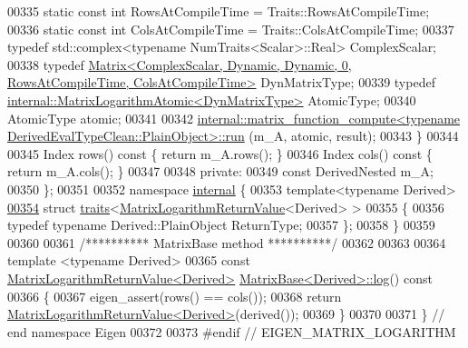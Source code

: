 \begin{DoxyCode}
00335     \textcolor{keyword}{static} \textcolor{keyword}{const} \textcolor{keywordtype}{int} RowsAtCompileTime = Traits::RowsAtCompileTime;
00336     \textcolor{keyword}{static} \textcolor{keyword}{const} \textcolor{keywordtype}{int} ColsAtCompileTime = Traits::ColsAtCompileTime;
00337     \textcolor{keyword}{typedef} std::complex<typename NumTraits<Scalar>::Real> ComplexScalar;
00338     \textcolor{keyword}{typedef} 
      \hyperlink{group___core___module_class_eigen_1_1_matrix}{Matrix<ComplexScalar, Dynamic, Dynamic, 0, RowsAtCompileTime, ColsAtCompileTime>}
       DynMatrixType;
00339     \textcolor{keyword}{typedef} \hyperlink{class_eigen_1_1internal_1_1_matrix_logarithm_atomic}{internal::MatrixLogarithmAtomic<DynMatrixType>} 
      AtomicType;
00340     AtomicType atomic;
00341     
00342     
      \hyperlink{struct_eigen_1_1internal_1_1matrix__function__compute_a55a328773f5254d0cd29ac699bc2634f}{internal::matrix\_function\_compute<typename DerivedEvalTypeClean::PlainObject>::run}
      (m\_A, atomic, result);
00343   \}
00344 
00345   Index rows()\textcolor{keyword}{ const }\{ \textcolor{keywordflow}{return} m\_A.rows(); \}
00346   Index cols()\textcolor{keyword}{ const }\{ \textcolor{keywordflow}{return} m\_A.cols(); \}
00347   
00348 \textcolor{keyword}{private}:
00349   \textcolor{keyword}{const} DerivedNested m\_A;
00350 \};
00351 
00352 \textcolor{keyword}{namespace }\hyperlink{namespaceinternal}{internal} \{
00353   \textcolor{keyword}{template}<\textcolor{keyword}{typename} Derived>
\hyperlink{struct_eigen_1_1internal_1_1traits_3_01_matrix_logarithm_return_value_3_01_derived_01_4_01_4}{00354}   \textcolor{keyword}{struct }\hyperlink{struct_eigen_1_1internal_1_1traits}{traits}<\hyperlink{class_eigen_1_1_matrix_logarithm_return_value}{MatrixLogarithmReturnValue}<Derived> >
00355   \{
00356     \textcolor{keyword}{typedef} \textcolor{keyword}{typename} Derived::PlainObject ReturnType;
00357   \};
00358 \}
00359 
00360 
00361 \textcolor{comment}{/********** MatrixBase method **********/}
00362 
00363 
00364 \textcolor{keyword}{template} <\textcolor{keyword}{typename} Derived>
00365 \textcolor{keyword}{const} \hyperlink{class_eigen_1_1_matrix_logarithm_return_value}{MatrixLogarithmReturnValue<Derived>} 
      \hyperlink{group___core___module_class_eigen_1_1_matrix_base}{MatrixBase<Derived>::log}()\textcolor{keyword}{ const}
00366 \textcolor{keyword}{}\{
00367   eigen\_assert(rows() == cols());
00368   \textcolor{keywordflow}{return} \hyperlink{class_eigen_1_1_matrix_logarithm_return_value}{MatrixLogarithmReturnValue<Derived>}(derived());
00369 \}
00370 
00371 \} \textcolor{comment}{// end namespace Eigen}
00372 
00373 \textcolor{preprocessor}{#endif // EIGEN\_MATRIX\_LOGARITHM}
\end{DoxyCode}
